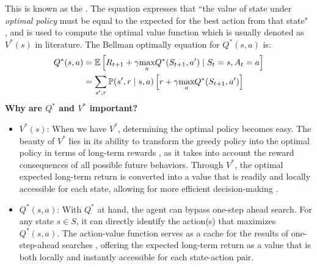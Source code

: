 This is known as the . The equation expresses that ``the value of  state under \textit{optimal policy} must be equal to the expected for the best action from that state" \cite{RL}, and
is used to compute the optimal value function which is usually denoted as $V^*(s)$ in literature.
The Bellman optimally equation for $Q^*(s,a)$ is:
\begin{align*}
    Q^{*}(s,a) &= \mathbb E \left [R_{t+1}
    + \gamma \underset{a}{\text{max}}Q^*(S_{t+1},a')  \mid S_{t} =s, A_t = a \right] \\
    &= \sum_{s',r}\mathbb P(s',r \mid s,a)
    \left [r + \gamma \underset{a}{\text{max}}Q^*(S_{t+1},a') 
    \right]
\end{align*}
\textbf{Why are $Q^*$ and $V^*$ important?}
\begin{itemize}
    \item $V^*(s)$: When we have $V^*$, determining the optimal policy becomes easy. The beauty of $V^*$ lies in its ability to transform the greedy policy into the optimal policy in terms of long-term rewards \cite{RL}, as it takes into account the reward consequences of all possible future behaviors. Through $V^*$, the optimal expected long-term return is converted into a value that is readily and locally accessible for each state, allowing for more efficient decision-making \cite{RL}.
     
    \item $Q^*(s,a)$: With $Q^*$ at hand, the agent can bypass one-step ahead search. For any state $s \in S$, it can directly identify the action(s) that maximizes $Q^*(s,a)$. The action-value function serves as a cache for the results of one-step-ahead searches \cite{RL}, offering the expected long-term return as a value that is both locally and instantly accessible for each state-action pair.
\end{itemize}




